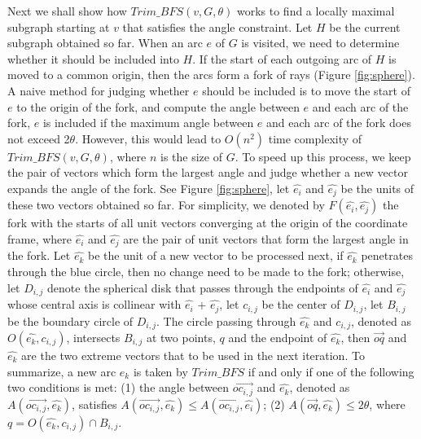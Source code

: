 Next we shall show how $Trim\_BFS(v, G, \theta)$ works to find a locally maximal subgraph starting at $v$ that satisfies the angle constraint. Let $H$ be the current subgraph obtained so far. When an arc $e$ of $G$ is visited, we need to determine whether it should be included into $H$. If the start of each outgoing arc of $H$ is moved to a common origin, then the arcs form a fork of rays (Figure \ref{fig:sphere}). A naive method for judging whether $e$ should be included is to move the start of $e$ to the origin of the fork, and compute the angle between $e$ and each arc of the fork, $e$ is included if the maximum angle between $e$ and each arc of the fork does not exceed 2$\theta$. However, this would lead to $O(n^{2})$ time complexity of $Trim\_BFS(v, G, \theta)$, where $n$ is the size of $G$. To speed up this process, we keep the pair of vectors which form the largest angle and judge whether a new vector expands the angle of the fork. See Figure \ref{fig:sphere}, let $\hat{e_i}$  and $\hat{e_j}$ be the units of these two vectors obtained so far. For simplicity, we denoted by $F( \hat{e_i}, \hat{e_j} )$ the fork with the starts of all unit vectors converging at the origin of the coordinate frame, where $\hat{e_i}$  and  $\hat{e_j}$  are the pair of unit vectors that form the largest angle in the fork. Let $\hat{e_k}$  be the unit of a new vector to be processed next, if $\hat{e_k}$ penetrates through the blue circle, then no change need to be made to the fork; otherwise, let $D_{i,j}$ denote the spherical disk that passes through the endpoints of $\hat{e_i}$  and $\hat{e_j}$ whose central axis is collinear with $\hat{e_i}$  + $\hat{e_j}$, let $c_{i,j}$ be the center of $D_{i,j}$, let $B_{i,j}$ be the boundary circle of $D_{i,j}$. The circle passing through $\hat{e_k}$  and $c_{i,j}$, denoted as $O( \hat{e_k}, c_{i,j})$, intersects  $B_{i,j}$ at two points, $q$ and the endpoint of $\hat{e_k}$, then $\overrightarrow{oq}$ and $\hat{e_k}$ are the two extreme vectors that to be used in the next iteration. To summarize, a new arc $e_k$ is taken by $Trim\_BFS$ if and only if one of the following two conditions is met:
(1) the angle between $\overrightarrow{oc_{i,j}}$ and $\hat{e_k}$, denoted as $A(\overrightarrow{oc_{i,j}}, \hat{e_k})$, satisfies  $A(\overrightarrow{oc_{i,j}}, \hat{e_k}) \leq A(\overrightarrow{oc_{i,j}}, \hat{e_i})$;
(2) $A(\overrightarrow{oq}, \hat{e_k})  \leq  2\theta$, where $q = O( \hat{e_k}, c_{i,j}) \cap B_{i,j}$.



